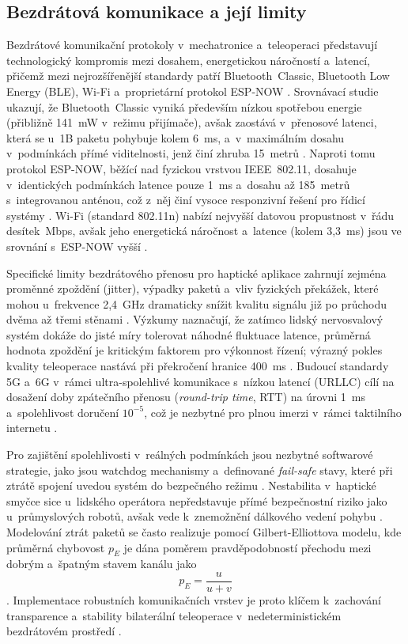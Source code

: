 \subsection{Bezdrátová komunikace a její limity}
Bezdrátové komunikační protokoly v~mechatronice a~teleoperaci představují technologický kompromis mezi dosahem, energetickou náročností a~latencí, přičemž mezi nejrozšířenější standardy patří Bluetooth~Classic, Bluetooth Low Energy (BLE), Wi-Fi a~proprietární protokol ESP-NOW \cite{Eridani2021918, Urazayev202354, Bolarinwa2022}.
Srovnávací studie ukazují, že Bluetooth~Classic vyniká především nízkou spotřebou energie (přibližně 141~mW v~režimu přijímače), avšak zaostává v~přenosové latenci, která se u~1B paketu pohybuje kolem 6~ms, a~v~maximálním dosahu v~podmínkách přímé viditelnosti, jenž činí zhruba 15~metrů \cite{Eridani2021918}.
Naproti tomu protokol ESP-NOW, běžící nad fyzickou vrstvou IEEE~802.11, dosahuje v~identických podmínkách latence pouze 1~ms a~dosahu až 185~metrů s~integrovanou anténou, což z~něj činí vysoce responzivní řešení pro řídicí systémy \cite{Eridani2021918, Urazayev202354, Papakonstantinou20251218}.
Wi-Fi (standard 802.11n) nabízí nejvyšší datovou propustnost v~řádu desítek~Mbps, avšak jeho energetická náročnost a~latence (kolem 3,3~ms) jsou ve srovnání s~ESP-NOW vyšší \cite{Eridani2021918, Urazayev202354}.

Specifické limity bezdrátového přenosu pro haptické aplikace zahrnují zejména proměnné zpoždění (jitter), výpadky paketů a~vliv fyzických překážek, které mohou u~frekvence 2,4~GHz dramaticky snížit kvalitu signálu již po průchodu dvěma až třemi stěnami \cite{Suman2025, Urazayev202354}.
Výzkumy naznačují, že zatímco lidský nervosvalový systém dokáže do jisté míry tolerovat náhodné fluktuace latence, průměrná hodnota zpoždění je kritickým faktorem pro výkonnost řízení; výrazný pokles kvality teleoperace nastává při překročení hranice 400~ms \cite{Suman2025, Bolarinwa2022}.
Budoucí standardy 5G a~6G v~rámci ultra-spolehlivé komunikace s~nízkou latencí (URLLC) cílí na dosažení doby zpátečního přenosu (\textit{round-trip time}, RTT) na úrovni 1~ms a~spolehlivost doručení $10^{-5}$, což je nezbytné pro plnou imerzi v~rámci taktilního internetu \cite{Awais202375, Aijaz2018}.

Pro zajištění spolehlivosti v~reálných podmínkách jsou nezbytné softwarové strategie, jako jsou watchdog mechanismy a~definované \textit{fail-safe} stavy, které při ztrátě spojení uvedou systém do bezpečného režimu \cite{Bolarinwa2022, Black2025}.
Nestabilita v~haptické smyčce sice u~lidského operátora nepředstavuje přímé bezpečnostní riziko jako u~průmyslových robotů, avšak vede k~znemožnění dálkového vedení pohybu \cite{Black2025}.
Modelování ztrát paketů se často realizuje pomocí Gilbert-Elliottova modelu, kde průměrná chybovost $p_E$ je dána poměrem pravděpodobností přechodu mezi dobrým a~špatným stavem kanálu jako
%
\begin{equation}
    p_E = \frac{u}{u + v}
\end{equation}
%
\cite{Suman2025}.
Implementace robustních komunikačních vrstev je proto klíčem k~zachování transparence a~stability bilaterální teleoperace v~nedeterministickém bezdrátovém prostředí \cite{Aijaz2018, Bolarinwa2022, Patel2022, Kos2018}.

